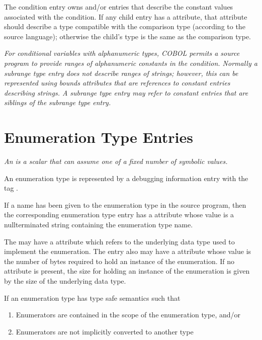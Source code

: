 The condition entry owns \DWTAGconstant{} and/or
\DWTAGsubrangetype{} entries that describe the constant
values associated with the condition. If any child entry 
has
a \DWATtype{} attribute,
that attribute should describe a type
compatible with the comparison type (according to the source
language); otherwise the child\textquoteright s type is the same as the
comparison type.

\textit{For conditional variables with alphanumeric types, COBOL
permits a source program to provide ranges of alphanumeric
constants in the condition. Normally a subrange type entry
does not describe ranges of strings; however, this can be
represented using bounds attributes that are references to
constant entries describing strings. A subrange type entry may
refer to constant entries that are siblings of the subrange
type entry.}


\section{Enumeration Type Entries}
\label{chap:enumerationtypeentries}

\textit{An  is a scalar that can assume one of
a fixed number of symbolic values.}

An enumeration type is represented by a debugging information
entry with the tag 
\DWTAGenumerationtypeTARG.

If a name has been given to the enumeration type in the source
program, then the corresponding enumeration type entry has
a \DWATname{} attribute
whose value is a null\dash terminated
string containing the enumeration type name.
\bbeb

The 
may have 
a \DWATtype{} attribute
which refers to the underlying data type used to implement
the enumeration. The entry also may have a 
\DWATbytesize{} attribute whose 
 value is the number of bytes 
required to hold an instance of the enumeration. If no \DWATbytesize{} attribute 
is present, the size for holding an instance of the enumeration is given by the size 
of the underlying data type.

If an enumeration type has type safe 
semantics such that

\begin{enumerate}[1. ]
\item Enumerators are contained in the scope of the enumeration type, and/or

\item Enumerators are not implicitly converted to another type
\end{enumerate}

